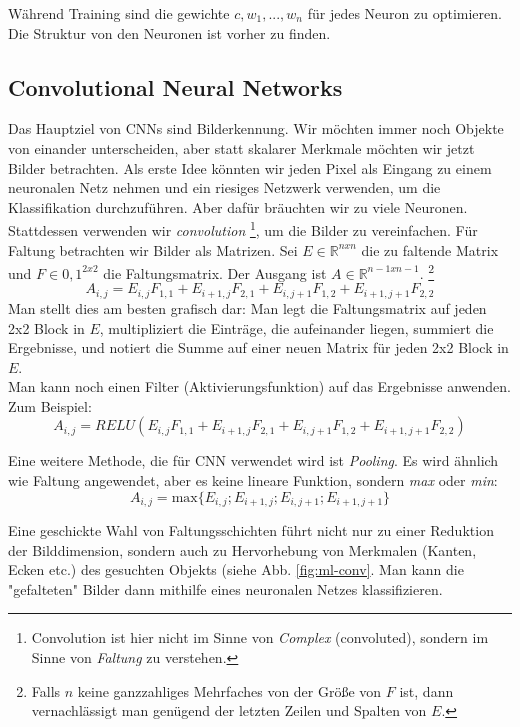 Während Training sind die gewichte $c, w_1,...,w_n$ für jedes Neuron zu optimieren. Die Struktur von den Neuronen ist vorher zu finden.

\subsection{Convolutional Neural Networks}
Das Hauptziel von CNNs sind Bilderkennung. Wir möchten immer noch Objekte von einander unterscheiden, aber statt skalarer Merkmale möchten wir jetzt Bilder betrachten. Als erste Idee könnten wir jeden Pixel als Eingang zu einem neuronalen Netz nehmen und ein riesiges Netzwerk verwenden, um die Klassifikation durchzuführen. Aber dafür bräuchten wir zu viele Neuronen. Stattdessen verwenden wir \textit{convolution} \footnote{Convolution ist hier nicht im Sinne von \textit{Complex} (convoluted), sondern im Sinne von \textit{Faltung} zu verstehen. }, um die Bilder zu vereinfachen. Für Faltung betrachten wir Bilder als Matrizen. Sei $E \in \mathbb{R}^{nxn}$ die zu faltende Matrix und $F \in {0,1}^{2x2}$ die Faltungsmatrix. Der Ausgang ist $A \in \mathbb{R}^{n-1xn-1}$. \footnote{Falls $n$ keine ganzzahliges Mehrfaches von der Größe von $F$ ist, dann vernachlässigt man genügend der letzten Zeilen und Spalten von $E$.}
\begin{equation}
    A_{i,j} = E_{i,j}F_{1,1} + E_{i+1,j}F_{2,1} + E_{i,j+1}F_{1,2} +E_{i+1,j+1}F_{2,2}     
\end{equation}
Man stellt dies am besten grafisch dar: Man legt die Faltungsmatrix auf jeden 2x2 Block in $E$, multipliziert die Einträge, die aufeinander liegen, summiert die Ergebnisse, und notiert die Summe auf einer neuen Matrix für jeden 2x2 Block in $E$. \\

Man kann noch einen Filter (Aktivierungsfunktion) auf das Ergebnisse anwenden. Zum Beispiel:
\begin{equation}
        A_{i,j} = RELU( E_{i,j}F_{1,1} + E_{i+1,j}F_{2,1} + E_{i,j+1}F_{1,2} +E_{i+1,j+1}F_{2,2} )
\end{equation}

Eine weitere Methode, die für CNN verwendet wird ist \textit{Pooling}. Es wird ähnlich wie Faltung angewendet, aber es keine lineare Funktion, sondern \textit{max} oder \textit{min}:
\begin{equation}
    A_{i,j} = \mathrm{max}\{E_{i,j};E_{i+1,j};E_{i,j+1};E_{i+1,j+1}\}
\end{equation}

Eine geschickte Wahl von Faltungsschichten führt nicht nur zu einer Reduktion der Bilddimension, sondern auch zu Hervorhebung von Merkmalen (Kanten, Ecken etc.) des gesuchten Objekts (siehe Abb. \ref{fig:ml-conv}. Man kann die "gefalteten" Bilder dann mithilfe eines neuronalen Netzes klassifizieren.

